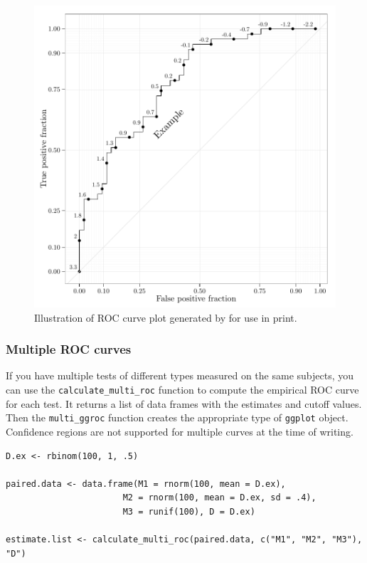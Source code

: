 \documentclass[article]{jss}
\begin{document}
\begin{figure}[htbp]
\centering
\includegraphics{figure/print-1.pdf}
\caption{Illustration of ROC curve plot generated by  for
use in print. \label{first}}
\end{figure}

\subsubsection{Multiple ROC curves}\label{multiple-roc-curves}

If you have multiple tests of different types measured on the same
subjects, you can use the \texttt{calculate\_multi\_roc} function to
compute the empirical ROC curve for each test. It returns a list of data
frames with the estimates and cutoff values. Then the
\texttt{multi\_ggroc} function creates the appropriate type of
\texttt{ggplot} object. Confidence regions are not supported for
multiple curves at the time of writing.

\begin{verbatim}
D.ex <- rbinom(100, 1, .5)

paired.data <- data.frame(M1 = rnorm(100, mean = D.ex), 
                       M2 = rnorm(100, mean = D.ex, sd = .4), 
                       M3 = runif(100), D = D.ex)

estimate.list <- calculate_multi_roc(paired.data, c("M1", "M2", "M3"), "D")
\end{verbatim}
\end{document}
